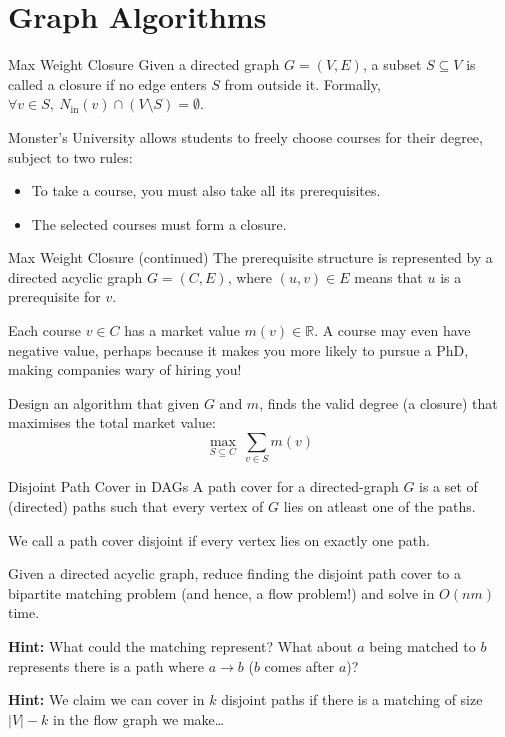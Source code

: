 \documentclass[aspectratio=169,11pt]{beamer}
\newcommand{\blankslides}{%
  \begin{frame}[plain]\end{frame}%
  \begin{frame}[plain]\end{frame}%
}
\begin{document}
\section{Graph Algorithms}

\begin{frame}{Max Weight Closure}
Given a directed graph $G=(V,E)$, a subset $S\subseteq V$ is called a closure if no edge enters $S$ from
outside it. Formally, $\forall v\in S,\ N_{\mathrm{in}}(v)\cap(V\setminus S)=\emptyset$.

\medskip
Monster's University allows students to freely choose courses for their degree, subject to two rules:
\begin{itemize}
  \item To take a course, you must also take all its prerequisites.
  \item The selected courses must form a closure.
\end{itemize}
\end{frame}

\begin{frame}{Max Weight Closure (continued)}
The prerequisite structure is represented by a directed acyclic graph $G=(C,E)$, where $(u,v)\in E$ means
that $u$ is a prerequisite for $v$.

\medskip
Each course $v\in C$ has a market value $m(v)\in\mathbb{R}$. A course may even have negative value, perhaps
because it makes you more likely to pursue a PhD, making companies wary of hiring you!

\medskip
Design an algorithm that given $G$ and $m$, finds the valid degree (a closure) that maximises the total
market value:
\[
  \max_{S\subseteq C}\ \sum_{v\in S} m(v)
\]
\end{frame}
\blankslides

\begin{frame}{Disjoint Path Cover in DAGs}
A path cover for a directed-graph $G$ is a set of (directed) paths such that every vertex of $G$ lies on
atleast one of the paths.

\medskip
We call a path cover disjoint if every vertex lies on exactly one path.

\medskip
Given a directed acyclic graph, reduce finding the disjoint path cover to a bipartite matching problem
(and hence, a flow problem!) and solve in $O(nm)$ time.

\medskip
\textbf{Hint:} What could the matching represent? What about $a$ being matched to $b$ represents there is
a path where $a\to b$ ($b$ comes after $a$)?

\medskip
\textbf{Hint:} We claim we can cover in $k$ disjoint paths if there is a matching of size $|V|-k$ in the
flow graph we make\ldots
\end{frame}
\blankslides
\end{document}
